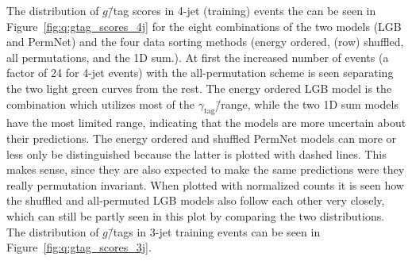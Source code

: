 The distribution of $g$\=/tag scores in 4-jet (training) events the can be seen in Figure~\ref{fig:q:gtag_scores_4j} for the eight combinations of the two models (LGB and PermNet) and the four data sorting methods (energy ordered, (row) shuffled, all permutations, and the 1D sum.). At first the increased number of events (a factor of \num{24} for 4-jet events) with the all-permutation scheme is seen separating the two light green curves from the rest. The energy ordered LGB model is the combination which utilizes most of the $\gamma_\mathrm{tag}$\=/range, while the two 1D sum models have the most limited range, indicating that the models are more uncertain about their predictions. The energy ordered and shuffled PermNet models can more or less only be distinguished because the latter is plotted with dashed lines. This makes sense, since they are also expected to make the same predictions were they really permutation invariant. When plotted with normalized counts it is seen how the shuffled and all-permuted LGB models also follow each other very closely, which can still be partly seen in this plot by comparing the two distributions. The distribution of $g$\=/tags in 3-jet training events can be seen in Figure~\ref{fig:q:gtag_scores_3j}. 

